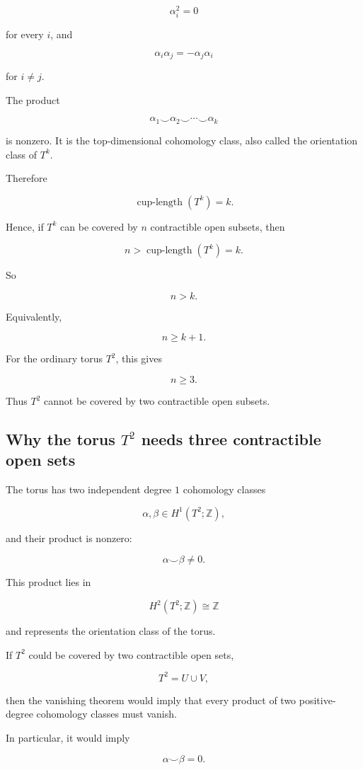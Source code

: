 \documentclass[12pt,a4paper]{article}
\theoremstyle{notespace}
\begin{document}
\[
\alpha_i^2=0
\]

for every \(i\), and

\[
\alpha_i\alpha_j=-\alpha_j\alpha_i
\]

for \(i\neq j\).

The product

\[
\alpha_1\smile\alpha_2\smile\cdots\smile\alpha_k
\]

is nonzero. It is the top-dimensional cohomology class, also called the orientation class of \(T^k\).

Therefore

\[
\operatorname{cup\text{-}length}(T^k)=k.
\]

Hence, if \(T^k\) can be covered by \(n\) contractible open subsets, then

\[
n>\operatorname{cup\text{-}length}(T^k)=k.
\]

So

\[
\boxed{
	n>k.
}
\]

Equivalently,

\[
\boxed{
	n\geq k+1.
}
\]

For the ordinary torus \(T^2\), this gives

\[
n\geq 3.
\]

Thus \(T^2\) cannot be covered by two contractible open subsets.

\subsection{Why the torus \(T^2\) needs three contractible open sets}

The torus has two independent degree \(1\) cohomology classes

\[
\alpha,\beta\in H^1(T^2;\mathbb Z),
\]

and their product is nonzero:

\[
\alpha\smile\beta\neq 0.
\]

This product lies in

\[
H^2(T^2;\mathbb Z)\cong \mathbb Z
\]

and represents the orientation class of the torus.

If \(T^2\) could be covered by two contractible open sets,

\[
T^2=U\cup V,
\]

then the vanishing theorem would imply that every product of two positive-degree cohomology classes must vanish.

In particular, it would imply

\[
\alpha\smile\beta=0.
\]
\end{document}
